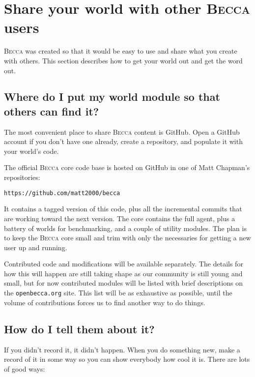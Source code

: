\chapter{Share your world with other \textsc{Becca} users}
\label{world_share}

\textsc{Becca} was created so that it would be easy to use and share what you create with others. This section describes how to get your world out and get the word out.

\section{Where do I put my world module so that others  can find it?}

The most convenient place to share \textsc{Becca} content is GitHub. Open a GitHub account if you don't have one already, create a repository, and populate it with your world's code. 

The official \textsc{Becca} core code base is hosted on GitHub in one of Matt Chapman's repositories:

\texttt{https://github.com/matt2000/becca}

It contains a tagged version of this code, plus all the incremental commits that are working toward the next version. The core contains the full agent, plus a battery of worlds for benchmarking, and a couple of utility modules. The plan is to keep the \textsc{Becca} core small and trim with only the necessaries for getting a new user up and running. 

Contributed code and modifications will be available separately. The details for how this will happen are still taking shape as our community is still young and small, but for now contributed modules will be listed with brief descriptions on the \texttt{openbecca.org} site. This list will be as exhaustive as possible, until the volume of contributions forces us to find another way to do things.

\section{How do I tell them about it?}

If you didn't record it, it didn't happen. When you do something new, make a record of it in some way so you can show everybody how cool it is. There are lots of good ways:

